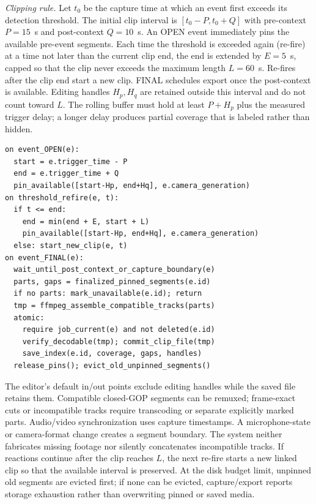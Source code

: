 \textit{Clipping rule.} Let $t_0$ be the capture time at which an event first exceeds its detection threshold. The initial clip interval is $[t_0-P,t_0+Q]$ with pre-context $P=15$~s and post-context $Q=10$~s. An OPEN event immediately pins the available pre-event segments. Each time the threshold is exceeded again (re-fire) at a time not later than the current clip end, the end is extended by $E=5$~s, capped so that the clip never exceeds the maximum length $L=60$~s. Re-fires after the clip end start a new clip. FINAL schedules export once the post-context is available. Editing handles $H_p,H_q$ are retained outside this interval and do not count toward $L$. The rolling buffer must hold at least $P+H_p$ plus the measured trigger delay; a longer delay produces partial coverage that is labeled rather than hidden.
\par\smallskip\noindent\begin{minipage}{\columnwidth}
\begin{lstlisting}
on event_OPEN(e):
  start = e.trigger_time - P
  end = e.trigger_time + Q
  pin_available([start-Hp, end+Hq], e.camera_generation)
on threshold_refire(e, t):
  if t <= end:
    end = min(end + E, start + L)
    pin_available([start-Hp, end+Hq], e.camera_generation)
  else: start_new_clip(e, t)
on event_FINAL(e):
  wait_until_post_context_or_capture_boundary(e)
  parts, gaps = finalized_pinned_segments(e.id)
  if no parts: mark_unavailable(e.id); return
  tmp = ffmpeg_assemble_compatible_tracks(parts)
  atomic:
    require job_current(e) and not deleted(e.id)
    verify_decodable(tmp); commit_clip_file(tmp)
    save_index(e.id, coverage, gaps, handles)
  release_pins(); evict_old_unpinned_segments()
\end{lstlisting}
\end{minipage}\par
The editor's default in/out points exclude editing handles while the saved file retains them. Compatible closed-GOP segments can be remuxed; frame-exact cuts or incompatible tracks require transcoding or separate explicitly marked parts. Audio/video synchronization uses capture timestamps. A microphone-state or camera-format change creates a segment boundary. The system neither fabricates missing footage nor silently concatenates incompatible tracks. If reactions continue after the clip reaches $L$, the next re-fire starts a new linked clip so that the available interval is preserved. At the disk budget limit, unpinned old segments are evicted first; if none can be evicted, capture/export reports storage exhaustion rather than overwriting pinned or saved media.

